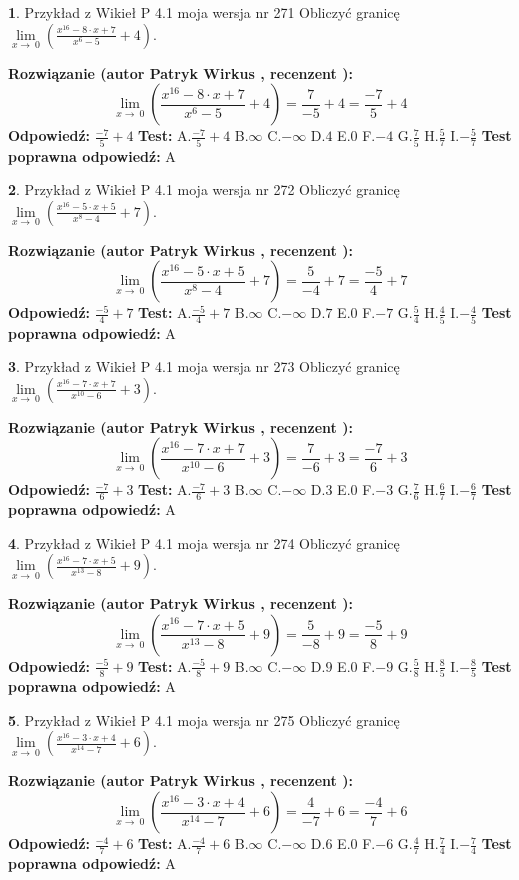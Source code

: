 \documentclass[12pt, a4paper]{article}
\theoremstyle{definition} %
\newtheorem{zad}{}
\newcommand{\zadStart}[1]{\begin{zad}#1\newline}
\newcommand{\zadStop}{\end{zad}}
\newcommand{\rozwStart}[2]{\noindent \textbf{Rozwiązanie (autor #1 , recenzent #2): }\newline}
\newcommand{\rozwStop}{\newline}
\newcommand{\odpStart}{\noindent \textbf{Odpowiedź:}\newline}
\newcommand{\odpStop}{\newline}
\newcommand{\testStart}{\noindent \textbf{Test:}\newline}
\newcommand{\testStop}{\newline}
\newcommand{\kluczStart}{\noindent \textbf{Test poprawna odpowiedź:}\newline}
\newcommand{\kluczStop}{\newline}
\begin{document}
\zadStart{Przykład z Wikieł P 4.1 moja wersja nr 271}
Obliczyć granicę $\lim\limits_{x\to\ 0}(\frac{x^{16}-8 \cdot x +7}{x^{6}-5}+4)$.
\zadStop
\rozwStart{Patryk Wirkus}{}
$$\lim\limits_{x\to\ 0}(\frac{x^{16}-8 \cdot x +7}{x^{6}-5}+4)=\frac{7}{-5}+4=\frac{-7}{5}+4$$
\rozwStop
\odpStart
$\frac{-7}{5}+4$
\odpStop
\testStart
A.$\frac{-7}{5}+4$
B.$\infty$
C.$-\infty$
D.$4$
E.$0$
F.$-4$
G.$\frac{7}{5}$
H.$\frac{5}{7}$
I.$-\frac{5}{7}$
\testStop
\kluczStart
A
\kluczStop



\zadStart{Przykład z Wikieł P 4.1 moja wersja nr 272}
Obliczyć granicę $\lim\limits_{x\to\ 0}(\frac{x^{16}-5 \cdot x +5}{x^{8}-4}+7)$.
\zadStop
\rozwStart{Patryk Wirkus}{}
$$\lim\limits_{x\to\ 0}(\frac{x^{16}-5 \cdot x +5}{x^{8}-4}+7)=\frac{5}{-4}+7=\frac{-5}{4}+7$$
\rozwStop
\odpStart
$\frac{-5}{4}+7$
\odpStop
\testStart
A.$\frac{-5}{4}+7$
B.$\infty$
C.$-\infty$
D.$7$
E.$0$
F.$-7$
G.$\frac{5}{4}$
H.$\frac{4}{5}$
I.$-\frac{4}{5}$
\testStop
\kluczStart
A
\kluczStop



\zadStart{Przykład z Wikieł P 4.1 moja wersja nr 273}
Obliczyć granicę $\lim\limits_{x\to\ 0}(\frac{x^{16}-7 \cdot x +7}{x^{10}-6}+3)$.
\zadStop
\rozwStart{Patryk Wirkus}{}
$$\lim\limits_{x\to\ 0}(\frac{x^{16}-7 \cdot x +7}{x^{10}-6}+3)=\frac{7}{-6}+3=\frac{-7}{6}+3$$
\rozwStop
\odpStart
$\frac{-7}{6}+3$
\odpStop
\testStart
A.$\frac{-7}{6}+3$
B.$\infty$
C.$-\infty$
D.$3$
E.$0$
F.$-3$
G.$\frac{7}{6}$
H.$\frac{6}{7}$
I.$-\frac{6}{7}$
\testStop
\kluczStart
A
\kluczStop



\zadStart{Przykład z Wikieł P 4.1 moja wersja nr 274}
Obliczyć granicę $\lim\limits_{x\to\ 0}(\frac{x^{16}-7 \cdot x +5}{x^{13}-8}+9)$.
\zadStop
\rozwStart{Patryk Wirkus}{}
$$\lim\limits_{x\to\ 0}(\frac{x^{16}-7 \cdot x +5}{x^{13}-8}+9)=\frac{5}{-8}+9=\frac{-5}{8}+9$$
\rozwStop
\odpStart
$\frac{-5}{8}+9$
\odpStop
\testStart
A.$\frac{-5}{8}+9$
B.$\infty$
C.$-\infty$
D.$9$
E.$0$
F.$-9$
G.$\frac{5}{8}$
H.$\frac{8}{5}$
I.$-\frac{8}{5}$
\testStop
\kluczStart
A
\kluczStop



\zadStart{Przykład z Wikieł P 4.1 moja wersja nr 275}
Obliczyć granicę $\lim\limits_{x\to\ 0}(\frac{x^{16}-3 \cdot x +4}{x^{14}-7}+6)$.
\zadStop
\rozwStart{Patryk Wirkus}{}
$$\lim\limits_{x\to\ 0}(\frac{x^{16}-3 \cdot x +4}{x^{14}-7}+6)=\frac{4}{-7}+6=\frac{-4}{7}+6$$
\rozwStop
\odpStart
$\frac{-4}{7}+6$
\odpStop
\testStart
A.$\frac{-4}{7}+6$
B.$\infty$
C.$-\infty$
D.$6$
E.$0$
F.$-6$
G.$\frac{4}{7}$
H.$\frac{7}{4}$
I.$-\frac{7}{4}$
\testStop
\kluczStart
A
\kluczStop
\end{document}

